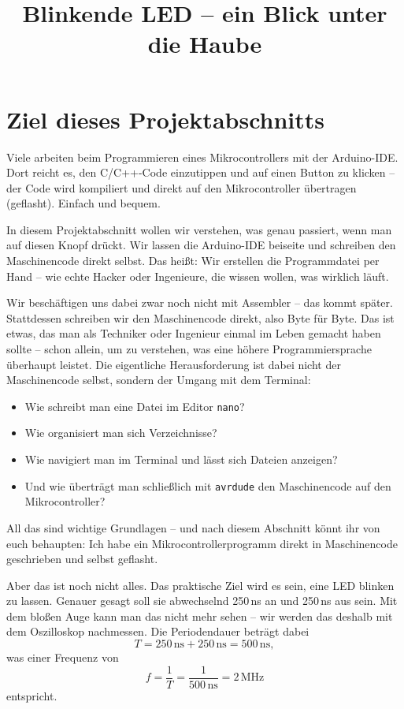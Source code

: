 \documentclass[a4paper,12pt]{article}
\title{Blinkende LED – ein Blick unter die Haube}
\author{}
\date{}
\begin{document}
\maketitle

\section{Ziel dieses Projektabschnitts}

Viele arbeiten beim Programmieren eines Mikrocontrollers mit der Arduino-IDE.
Dort reicht es, den C/C++-Code einzutippen und auf einen Button zu klicken –
der Code wird kompiliert und direkt auf den Mikrocontroller übertragen
(geflasht). Einfach und bequem.

In diesem Projektabschnitt wollen wir verstehen, was genau passiert, wenn
man auf diesen Knopf drückt. Wir lassen die Arduino-IDE beiseite und schreiben
den Maschinencode direkt selbst. Das heißt: Wir erstellen die Programmdatei per
Hand – wie echte Hacker oder Ingenieure, die wissen wollen, was wirklich läuft.

Wir beschäftigen uns dabei zwar noch nicht mit Assembler – das kommt später.
Stattdessen schreiben wir den Maschinencode direkt, also Byte für Byte. Das ist
etwas, das man als Techniker oder Ingenieur einmal im Leben gemacht haben
sollte – schon allein, um zu verstehen, was eine höhere Programmiersprache
überhaupt leistet.  Die eigentliche Herausforderung ist dabei nicht der
Maschinencode selbst, sondern der Umgang mit dem Terminal:
\begin{itemize}
    \item
	Wie schreibt man eine Datei im Editor \texttt{nano}?
    \item
	Wie organisiert man sich Verzeichnisse?
    \item
	Wie navigiert man im Terminal und lässt sich Dateien anzeigen?
    \item
	Und wie überträgt man schließlich mit \texttt{avrdude} den
	Maschinencode auf den Mikrocontroller?
\end{itemize}

\noindent
All das sind wichtige Grundlagen – und nach diesem Abschnitt könnt ihr von euch
behaupten: Ich habe ein Mikrocontrollerprogramm direkt in Maschinencode
geschrieben und selbst geflasht.

Aber das ist noch nicht alles. Das praktische Ziel wird es sein, eine LED
blinken zu lassen. Genauer gesagt soll sie abwechselnd 250\,ns an und 250\,ns
aus sein. Mit dem bloßen Auge kann man das nicht mehr sehen – wir werden das
deshalb mit dem Oszilloskop nachmessen.  Die Periodendauer beträgt dabei
\[
T = 250\,\text{ns} + 250\,\text{ns} = 500\,\text{ns},
\]
was einer Frequenz von
\[
f = \frac{1}{T} = \frac{1}{500\,\text{ns}} = 2\,\text{MHz}
\]
entspricht.
\end{document}
